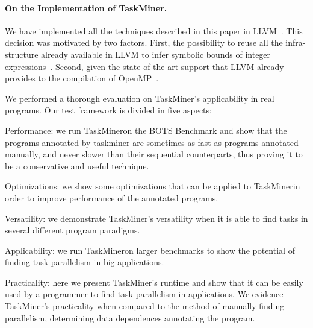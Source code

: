 \documentclass[sigplan,10pt,review,anonymous]{acmart}
\newcommand\Taskminer{\mbox{\textsf{TaskMiner}}}
\begin{document}


\paragraph{On the Implementation of \Taskminer.}
We have implemented all the techniques described in this paper in
LLVM~\cite{Lattner04}.
This decision was motivated by two factors.
First, the possibility to reuse all the infra-structure already
available in LLVM to infer symbolic bounds of integer
expressions~\cite{Mendonca17}.
Second, given the state-of-the-art support that LLVM already provides to the
compilation of OpenMP~\cite{Bertolli14,Martineau16,Samuel16}.

We performed a thorough evaluation on \Taskminer{}'s applicability in real programs. Our test framework is divided in five aspects:

\begin{compactitem}
\item \textsf{Performance}: we run \Taskminer on the BOTS Benchmark and show that the programs annotated by taskminer are sometimes as fast as programs annotated manually, and never slower than their sequential counterparts, thus proving it to be a conservative and useful technique. 
\item \textsf{Optimizations}: we show some optimizations that can be applied to \Taskminer in order to improve performance of the annotated programs.
\item \textsf{Versatility}: we demonstrate \Taskminer's versatility when it is able to find tasks in several different program paradigms.
\item \textsf{Applicability}: we run \Taskminer on larger benchmarks to show the potential of finding task parallelism in big applications.
\item \textsf{Practicality}: here we present \Taskminer's runtime and show that it can be easily used by a programmer to find task parallelism in applications. We evidence \Taskminer's practicality when compared to the method of manually finding parallelism, determining data dependences annotating the program.
\end{compactitem}
\end{document}
